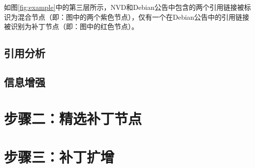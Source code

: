 \begin{exmp}
如图\ref{fig:example}中的第三层所示，NVD和Debian公告中包含的两个引用链接被标识为混合节点（即：图中的两个紫色节点），仅有一个在Debian公告中的引用链接被识别为补丁节点（即：图中的红色节点）。
\end{exmp}

\subsection{引用分析}

\subsection{信息增强}

\section{步骤二：精选补丁节点}

\section{步骤三：补丁扩增}